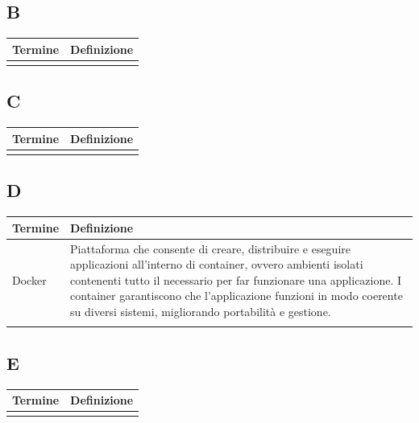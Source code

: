 \documentclass[10pt]{article}
\begin{document}
\subsection{B} %
\begin{tabularx}{\textwidth}{|>{\centering\arraybackslash}l|X|}
\hline
\rowcolor[gray]{0.8}
\textbf{Termine} & \textbf{Definizione}\\
\hline
 & \\
\hline
\end{tabularx}

\subsection{C} %
\begin{tabularx}{\textwidth}{|>{\centering\arraybackslash}l|X|}
\hline
\rowcolor[gray]{0.8}
\textbf{Termine} & \textbf{Definizione}\\
\hline
 & \\
\hline
\end{tabularx}

\subsection{D} %
\begin{tabularx}{\textwidth}{|>{\centering\arraybackslash}l|X|}
\hline
\rowcolor[gray]{0.8}
\textbf{Termine} & \textbf{Definizione}\\
\hline
Docker & Piattaforma che consente di creare, distribuire e eseguire applicazioni all'interno di container, ovvero ambienti isolati contenenti tutto il necessario per far funzionare una applicazione. I container garantiscono che l'applicazione funzioni in modo coerente su diversi sistemi, migliorando portabilità e gestione.\\
\hline
 & \\
\hline
\end{tabularx}

\subsection{E} %
\begin{tabularx}{\textwidth}{|>{\centering\arraybackslash}l|X|}
\hline
\rowcolor[gray]{0.8}
\textbf{Termine} & \textbf{Definizione}\\
\hline
 & \\
\hline
\end{tabularx}
\end{document}
